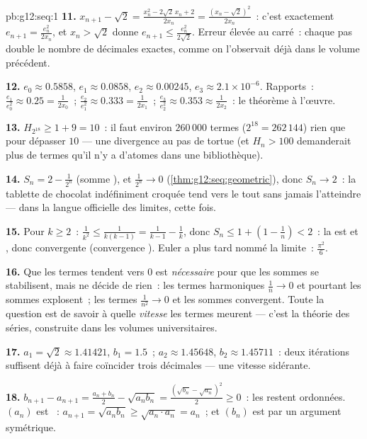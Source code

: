 \begin{solution}{pb:g12:seq:1}
\textbf{11.} $x_{n+1} - \sqrt2 = \frac{x_n^2 - 2\sqrt2\,x_n +
2}{2x_n} = \frac{(x_n - \sqrt2)^2}{2x_n}$~: c'est exactement
$e_{n+1} = \frac{e_n^2}{2x_n}$, et $x_n > \sqrt2$ donne
$e_{n+1} \leq \frac{e_n^2}{2\sqrt2}$. Erreur élevée au carré~:
chaque pas double le nombre de décimales exactes, comme on
l'observait déjà dans le volume précédent.

\textbf{12.} $e_0 \approx 0.5858$, $e_1 \approx 0.0858$,
$e_2 \approx 0.00245$, $e_3 \approx 2.1 \times 10^{-6}$.
Rapports~: $\frac{e_1}{e_0^2} \approx 0.25 = \frac{1}{2x_0}$~;
$\frac{e_2}{e_1^2} \approx 0.333 = \frac{1}{2x_1}$~;
$\frac{e_3}{e_2^2} \approx 0.353 \approx \frac{1}{2x_2}$~: le
théorème à l'œuvre.

\textbf{13.} $H_{2^{18}} \geq 1 + 9 = 10$~: il faut environ
$260\,000$ termes ($2^{18} = 262\,144$) rien que pour dépasser $10$
--- une divergence au pas de tortue (et $H_n > 100$ demanderait plus
de termes qu'il n'y a d'atomes dans une bibliothèque).

\textbf{14.} $S_n = 2 - \frac{1}{2^n}$ (somme ), et
$\frac{1}{2^n} \to 0$ (\cref{thm:g12:seq:geometric}), donc
$S_n \to 2$~: la tablette de chocolat indéfiniment croquée tend
vers le tout sans jamais l'atteindre --- dans la langue officielle
des limites, cette fois.

\textbf{15.} Pour $k \geq 2$~:
$\frac{1}{k^2} \leq \frac{1}{k(k-1)} = \frac{1}{k-1} - \frac1k$,
donc $S_n \leq 1 + \left(1 - \frac1n\right) < 2$~: la  est
 et , donc convergente (convergence ).
Euler a plus tard nommé la limite~: $\frac{\pi^2}{6}$.

\textbf{16.} Que les termes tendent vers $0$ est \emph{nécessaire}
pour que les sommes se stabilisent, mais ne décide de rien~: les
termes harmoniques $\frac1n \to 0$ et pourtant les sommes explosent~;
les termes $\frac{1}{n^2} \to 0$ et les sommes convergent. Toute la
question est de savoir à quelle \emph{vitesse} les termes meurent
--- c'est la théorie des séries, construite dans les volumes
universitaires.

\textbf{17.} $a_1 = \sqrt2 \approx 1.41421$, $b_1 = 1.5$~;
$a_2 \approx 1.45648$, $b_2 \approx 1.45711$~: deux itérations
suffisent déjà à faire coïncider trois décimales --- une vitesse
sidérante.

\textbf{18.} $b_{n+1} - a_{n+1} = \frac{a_n + b_n}{2} -
\sqrt{a_n b_n} = \frac{(\sqrt{b_n} - \sqrt{a_n})^2}{2} \geq 0$~:
les  restent ordonnées. $(a_n)$ est ~:
$a_{n+1} = \sqrt{a_n b_n} \geq \sqrt{a_n \cdot a_n} = a_n$~; et
$(b_n)$ est  par un argument symétrique.


\end{solution}
